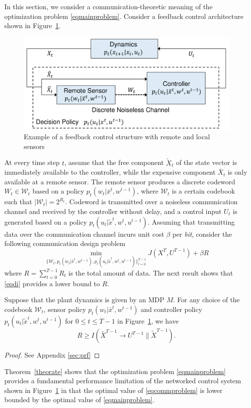 
In this section, we consider a communication-theoretic meaning of the optimization problem \eqref{eqmainproblem}. Consider a feedback control architecture shown in Figure~\ref{fig:NCS}. 


\begin{figure}
\centering
\includegraphics[width=\columnwidth]{comm.pdf}
\caption{Example of a feedback control structure with remote and local sensors}
\label{fig:NCS}
\end{figure}


At every time step $t$, assume that the free component $\tilde{X}_t$ of the state vector is immediately available to the controller, while the expensive component $\bar{X}_t$ is only available at a remote sensor. The remote sensor produces a discrete codeword $W_t\in\mathcal{W}_t$ based on a policy $p_t(w_t|\bar{x}^t, w^{t-1})$, where $\mathcal{W}_t$ is a certain codebook such that $|\mathcal{W}_t|=2^{R_t}$. Codeword is transmitted over a noiseless communication channel and received by the controller without delay, and a control input $U_t$ is generated based on a policy $p_t(u_t|\tilde{x}^t, w^t, u^{t-1})$.
Assuming that transmitting data over the communication channel incurs unit cost $\beta$ per \emph{bit}, consider the following communication design problem
\begin{equation}
\min_{\{\mathcal{W}_t, p_t(w_t|\bar{x}^t, w^{t-1}), p_t(u_t|\tilde{x}^t, w^t, u^{t-1}) \}_{t=0}^{T-1}}  J(X^T, U^{T-1}) +\beta R \label{eqcommproblem}
\end{equation}
where $R=\sum_{t=0}^{T-1}R_t$ is the total amount of data. 
The next result shows that \eqref{eqdi} provides a lower bound to $R$.
\begin{theorem}
\label{theorate}
Suppose that the plant dynamics is given by an MDP $M$. For any choice of the codebook $\mathcal{W}_t$, sensor policy $p_t(w_t|\bar{x}^t, w^{t-1})$ and controller policy $p_t(u_t|\tilde{x}^t, w^t, u^{t-1})$ for $0\leq t\leq T-1$ in Figure~\ref{fig:NCS}, we have
\[
R \geq I(\bar{X}^{T-1}\rightarrow U^{T-1}\| \tilde{X}^{T-1}).
\]
\end{theorem}
\begin{proof}
See Appendix \ref{sec:prf}
\end{proof}
Theorem~\ref{theorate} shows that the optimization problem \eqref{eqmainproblem} provides a fundamental performance limitation of the networked control system shown in Figure~\ref{fig:NCS} in that the optimal value of \eqref{eqcommproblem} is lower bounded by the optimal value of \eqref{eqmainproblem}.




